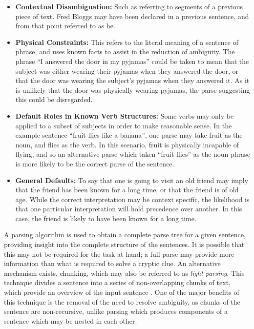 \begin{itemize}
	\item\textbf{Contextual Disambiguation:}  Such as referring to segments of a previous piece of text. Fred Bloggs may have been declared in a previous sentence, and from that point referred to as he.
	\item\textbf{Physical Constraints:} This refers to the literal meaning of a sentence of phrase, and uses known facts to assist in the reduction of ambiguity. The phrase “I answered the door in my pyjamas” could be taken to mean that the subject was either wearing their pyjamas when they answered the door, or that the door was wearing the subject’s pyjamas when they answered it. As it is unlikely that the door was physically wearing pyjamas, the parse suggesting this could be disregarded.
	\item\textbf{Default Roles in Known Verb Structures:} Some verbs may only be applied to a subset of subjects in order to make reasonable sense. In the example sentence “fruit flies like a banana”, one parse may take fruit as the noun, and flies as the verb. In this scenario, fruit is physically incapable of flying, and so an alternative parse which taken “fruit flies” as the noun-phrase is more likely to be the correct parse of the sentence. 
	\item\textbf{General Defaults:} To say that one is going to visit an old friend may imply that the friend has been known for a long time, or that the friend is of old age. While the correct interpretation may be context specific, the likelihood is that one particular interpretation will hold precedence over another. In this case, the friend is likely to have been known for a long time.
\end{itemize}

\begin{flushright}
	\citep{mccluskey99}
\end{flushright}

A parsing algorithm is used to obtain a complete parse tree for a given sentence, providing insight into the complete structure of the sentences. It is possible that this may not be required for the task at hand; a full parse may provide more information than what is required to solve a cryptic clue. An alternative mechanism exists, chunking, which may also be referred to as \emph{light parsing}. This technique divides a sentence into a series of non-overlapping chunks of text, which provide an overview of the input sentence \citep{litman03}. One of the major benefits of this technique is the removal of the need to resolve ambiguity, as chunks of the sentence are non-recursive, unlike parsing which produces components of a sentence which may be nested in each other.

